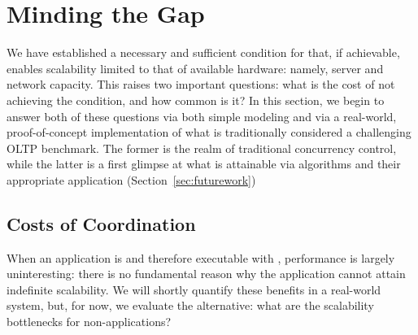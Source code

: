 
\section{Minding the Gap}
\label{sec:evaluation}

We have established a necessary and sufficient condition for \cfreedom
that, if achievable, enables scalability limited to that of available
hardware: namely, server and network capacity. This raises two
important questions: what is the cost of not achieving the \cfree
condition, and how common is it? In this section, we begin to answer
both of these questions via both simple modeling and via a real-world,
proof-of-concept implementation of what is traditionally considered a
challenging OLTP benchmark. The former is the realm of traditional
concurrency control, while the latter is a first glimpse at what is
attainable via \cfree algorithms and their appropriate application
(Section~\ref{sec:futurework})

\subsection{Costs of Coordination}

When an application is \iconfluent and therefore executable with
\cfreedom, performance is largely uninteresting: there is no
fundamental reason why the application cannot attain indefinite
scalability. We will shortly quantify these benefits in a real-world
system, but, for now, we evaluate the alternative: what are the
scalability bottlenecks for non-\cfree applications?


